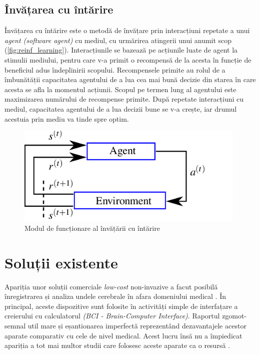 \subsection*{Învățarea cu întărire}
Învățarea cu întărire este o metodă de învățare prin interacțiuni repetate a unui \textit{agent (software agent)} cu mediul, cu urmărirea atingerii unui anumit scop (\autoref*{fig:reinf_learning}). Interacțiunile se bazează pe acțiunile luate de agent la stimulii mediului, pentru care v-a primit o recompensă de la acesta în funcție de beneficiul adus îndeplinirii scopului. Recompensele primite au rolul de a îmbunătății capacitatea agentului de a lua cea mai bună decizie din starea în care acesta se afla la momentul acțiunii. Scopul pe termen lung al agentului este maximizarea numărului de recompense primite. După repetate interacțiuni cu mediul, capacitatea agentului de a lua decizii bune se v-a crește, iar drumul acestuia prin mediu va tinde spre optim.
\begin{figure}[h]
	\center
	\includegraphics[width=11cm, keepaspectratio]{fig/cap1/The-reinforcement-learning-paradigm-consists-of-an-agent-interacting-with-an.png}
	\caption{Modul de funcționare al învățării cu întărire \cite{fig:reinforcement}}
	\label{fig:reinf_learning}
\end{figure}

\section{Soluții existente}
Apariția unor soluții comerciale \textit{low-cost} non-invazive a facut posibilă înregistrarea și analiza undele cerebrale în afara domeniului medical \cite{online:emotiv}. În principal, aceste dispozitive sunt folosite în activități simple de interfațare a creierului cu calculatorul \textit{(BCI - Brain-Computer Interface)}. Raportul zgomot-semnal util mare și eșantionarea imperfectă reprezentând dezavantajele acestor aparate comparativ cu cele de nivel medical. Acest lucru însă nu a împiedicat apariția a tot mai multor studii care folosesc aceste aparate ca o resursă \cite{consumer-eeg:2018}.

